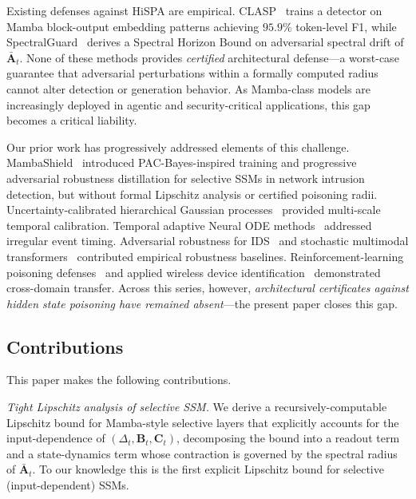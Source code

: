 \documentclass[12pt,a4paper]{article}
\theoremstyle{definition}
\theoremstyle{remark}
\begin{document}
Existing defenses against HiSPA are empirical. CLASP~\cite{lemercier2026clasp} trains a detector on Mamba block-output embedding patterns achieving $95.9\%$ token-level F1, while Spectral\-Guard~\cite{lemercier2026spectralguard} derives a Spectral Horizon Bound on adversarial spectral drift of $\bar{\mathbf{A}}_t$. None of these methods provides \emph{certified} architectural defense---a worst-case guarantee that adversarial perturbations within a formally computed radius cannot alter detection or generation behavior. As Mamba-class models are increasingly deployed in agentic and security-critical applications, this gap becomes a critical liability.

Our prior work has progressively addressed elements of this challenge. MambaShield~\cite{anaedevha2025mambashield} introduced PAC-Bayes-inspired training and progressive adversarial robustness distillation for selective SSMs in network intrusion detection, but without formal Lipschitz analysis or certified poisoning radii. Uncertainty-calibrated hierarchical Gaussian processes~\cite{anaedevha2026uchgp} provided multi-scale temporal calibration. Temporal adaptive Neural ODE methods~\cite{anaedevha2026tanode} addressed irregular event timing. Adversarial robustness for IDS~\cite{anaedevha2024adversarial} and stochastic multimodal transformers~\cite{anaedevha2025stochastic} contributed empirical robustness baselines. Reinforcement-learning poisoning defenses~\cite{anaedevha2025dqn} and applied wireless device identification~\cite{anaedevha2024wireless} demonstrated cross-domain transfer. Across this series, however, \emph{architectural certificates against hidden state poisoning have remained absent}---the present paper closes this gap.

\subsection{Contributions}

This paper makes the following contributions.

\textit{Tight Lipschitz analysis of selective SSM.} We derive a recursively-computable Lipschitz bound for Mamba-style selective layers that explicitly accounts for the input-dependence of $(\Delta_t, \mathbf{B}_t, \mathbf{C}_t)$, decomposing the bound into a readout term and a state-dynamics term whose contraction is governed by the spectral radius of $\bar{\mathbf{A}}_t$. To our knowledge this is the first explicit Lipschitz bound for selective (input-dependent) SSMs.
\end{document}
